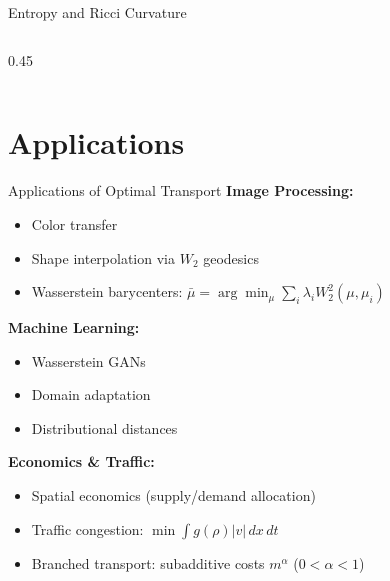 \documentclass[aspectratio=169]{beamer}
\begin{document}
\begin{frame}{Entropy and Ricci Curvature}
\begin{columns}
\begin{column}{0.45\textwidth}
\begin{center}
\end{center}
\end{column}
\end{columns}
\end{frame}

\section{Applications}

\begin{frame}{Applications of Optimal Transport}
\textbf{Image Processing:}
\begin{itemize}
    \item Color transfer
    \item Shape interpolation via $W_2$ geodesics
    \item Wasserstein barycenters: $\bar\mu = \arg\min_\mu \sum_i \lambda_i W_2^2(\mu, \mu_i)$
\end{itemize}

\vspace{0.3cm}
\textbf{Machine Learning:}
\begin{itemize}
    \item Wasserstein GANs
    \item Domain adaptation
    \item Distributional distances
\end{itemize}

\vspace{0.3cm}
\textbf{Economics \& Traffic:}
\begin{itemize}
    \item Spatial economics (supply/demand allocation)
    \item Traffic congestion: $\min \int g(\rho) |v| \, dx\,dt$
    \item Branched transport: subadditive costs $m^\alpha$ ($0 < \alpha < 1$)
\end{itemize}
\end{frame}
\end{document}

